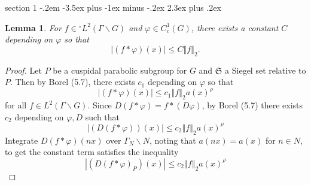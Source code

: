 \documentclass[12pt]{article}
\makeatletter
\theoremstyle{norm}
\newtheorem{lem}[thm]{Lemma}
\newcommand{\N}[0]{\mathbb{N}}
\newcommand{\al}[0]{\alpha}
\newcommand{\Ga}[0]{\Gamma}
\newcommand{\ph}[0]{\varphi}
\newcommand{\rh}[0]{\rho}
\newcommand{\pa}[1]{\left( {#1} \right)}
\newcommand{\ve}[1]{\left\Vert{#1}\right\Vert}
\newcommand{\bs}[0]{\backslash}
\newenvironment{problem}{\@startsection
       {section}
       {1}
       {-.2em}
       {-3.5ex plus -1ex minus -.2ex}
       {2.3ex plus .2ex}
       {\pagebreak[3]%
       \large\bf\noindent{Problem }
       }
       }
       {
       }
\makeatother
\begin{document}
\begin{problem}{\it }
\begin{lem}
For $f\in {}^{\circ}L^2(\Ga\bs G)$ and $\ph\in C^1_c(G)$, there exists a constant $C$ depending on $\ph$ so that 
\[
|(f*\ph)(x)|\le C\ve{f}_2.
\]
\end{lem}
\begin{proof}
%
%
%
Let $P$ be a cuspidal parabolic subgroup for $G$ and $\mathfrak S$ a Siegel set relative to $P$. Then by Borel (5.7), there exists $c_1$ depending on $\ph$ so that
\[
|(f*\ph)(x)|\le c_1\ve{f}_2 a(x)^{\rh}
\]
for all $f\in L^2(\Ga \bs G)$. 
Since $D(f*\ph)=f*(D\ph)$, by Borel (5.7) there exists $c_2$ depending on $\ph,D$ such that
\[
|(D(f*\ph))(x)|\le c_2\ve{f}_2 a(x)^{\rh}
\]
Integrate $D(f*\ph)(nx)$ over $\Ga_N\bs N$, noting that $a(nx)=a(x)$ for $n\in N$, to get the constant term satisfies the inequality
\[
|(D(f*\ph)_P)(x)|\le c_2\ve{f}_2 a(x)^{\rh}
\]


\end{proof}
\end{problem}
\end{document}
